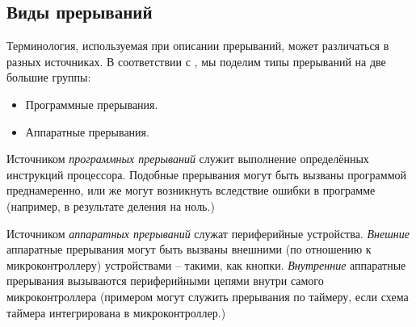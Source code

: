 \documentclass[../sparc.tex]{subfiles}
\begin{document}
\subsection{Виды прерываний}


Терминология, используемая при описании прерываний, может различаться в разных
источниках.  В соответствии с \cite{toshiba:interrupts}, мы поделим типы
прерываний на две большие группы:
\begin{itemize}
\item Программные прерывания.
\item Аппаратные прерывания.
\end{itemize}

Источником \emph{программных прерываний} служит выполнение определённых
инструкций процессора.  Подобные прерывания могут быть вызваны программой
преднамеренно, или же могут возникнуть вследствие ошибки в программе (например,
в результате деления на ноль.)

Источником \emph{аппаратных прерываний} служат периферийные устройства.
\emph{Внешние} аппаратные прерывания могут быть вызваны внешними (по отношению к
микроконтроллеру) устройствами -- такими, как кнопки.  \emph{Внутренние}
аппаратные прерывания вызываются периферийными цепями внутри самого
микроконтроллера (примером могут служить прерывания по таймеру, если схема
таймера интегрирована в микроконтроллер.)
\end{document}
